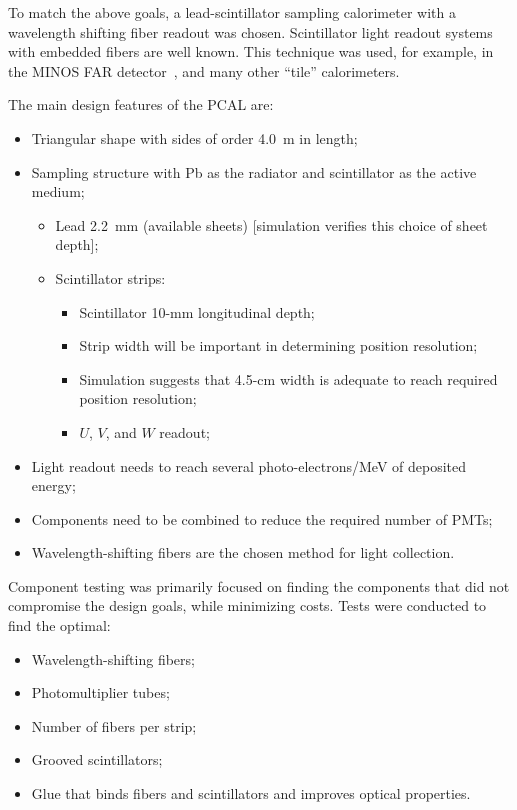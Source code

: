 To match the above goals, a lead-scintillator sampling calorimeter with a
wavelength shifting fiber readout was chosen.  Scintillator light readout 
systems with embedded fibers are well known.  This technique was used, for
example, in the MINOS FAR detector~\cite{MINOS}, and many other ``tile''
calorimeters. 

The main design features of the PCAL are:

\begin{itemize}
\item Triangular shape with sides of order 4.0~m in length;
\item Sampling structure with Pb as the radiator and scintillator as the 
      active medium;
  \begin{itemize}
  \item Lead 2.2~mm (available sheets) [simulation verifies this choice of 
        sheet depth];
  \item Scintillator strips:
      \begin{itemize}
      \item Scintillator 10-mm longitudinal depth;
      \item Strip width will be important in determining position resolution;
      \item Simulation suggests that 4.5-cm width is adequate to reach 
            required position resolution;
      \item $U$, $V$, and $W$ readout;
      \end{itemize}
   \end{itemize}
\item Light readout needs to reach several photo-electrons/MeV of deposited 
      energy;
\item Components need to be combined to reduce the required number of PMTs;
\item Wavelength-shifting fibers are the chosen method for light collection.
\end{itemize}

Component testing was primarily focused on finding the components that did 
not compromise the design goals, while minimizing costs.  Tests were 
conducted to find the optimal:
 
\begin{itemize}
\item Wavelength-shifting fibers;
\item Photomultiplier tubes;
\item Number of fibers per strip;
\item Grooved scintillators;
\item Glue that binds fibers and scintillators and improves optical properties.
\end{itemize}

